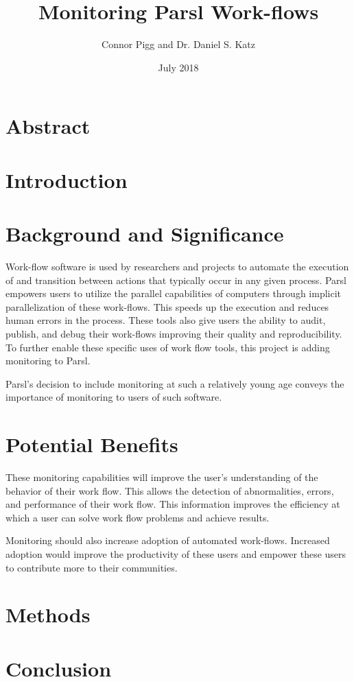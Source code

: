 \documentclass{article}
\title{Monitoring Parsl Work-flows}
\author{Connor Pigg and Dr. Daniel S. Katz}
\date{July 2018}
\begin{document}
\maketitle

\section{Abstract}

\pagebreak

\section{Introduction}


\section{Background and Significance}
Work-flow software is used by researchers and projects to automate the execution of and transition between actions that typically occur in any given process.
Parsl empowers users to utilize the parallel capabilities of computers through implicit parallelization of these work-flows.
This speeds up the execution and reduces human errors in the process.
These tools also give users the ability to audit, publish, and debug their work-flows improving their quality and reproducibility.
To further enable these specific uses of work flow tools, this project is adding monitoring to Parsl.

Parsl's decision to include monitoring at such a relatively young age conveys the importance of monitoring to users of such software.

\section{Potential Benefits}
These monitoring capabilities will improve the user's understanding of the behavior of their work flow.
This allows the detection of abnormalities, errors, and performance of their work flow.
This information improves the efficiency at which a user can solve work flow problems and achieve results.

Monitoring should also increase adoption of automated work-flows.
Increased adoption would improve the productivity of these users and empower these users to contribute more to their communities.

\section{Methods}


\section{Conclusion}




\end{document}

